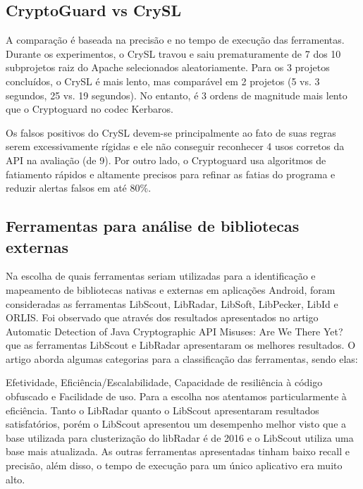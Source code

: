\subsection{CryptoGuard vs CrySL} %

A comparação é baseada na precisão e no tempo de execução das ferramentas. Durante os experimentos, o CrySL travou e saiu prematuramente de 7 dos 10 subprojetos raiz do Apache selecionados aleatoriamente. Para os 3 projetos concluídos, o CrySL é mais lento, mas comparável em 2 projetos (5 vs. 3 segundos, 25 vs. 19 segundos). No entanto, é 3 ordens de magnitude mais lento que o Cryptoguard no codec Kerbaros. 

Os falsos positivos do CrySL devem-se principalmente ao fato de suas regras serem excessivamente rígidas e ele não conseguir reconhecer 4 usos corretos da API na avaliação (de 9). Por outro lado, o Cryptoguard usa algoritmos de fatiamento rápidos e altamente precisos para refinar as fatias do programa e reduzir alertas falsos em até 80\%. 

\subsection{Ferramentas para análise de bibliotecas externas} %

Na escolha de quais ferramentas seriam utilizadas para a identificação e mapeamento de bibliotecas nativas e externas em aplicações Android, foram consideradas as ferramentas LibScout, LibRadar, LibSoft, LibPecker, LibId e ORLIS. Foi observado que através dos resultados apresentados no artigo Automatic Detection of Java Cryptographic API Misuses: Are We There Yet? que as ferramentas LibScout e LibRadar apresentaram os melhores resultados. O artigo aborda algumas categorias para a classificação das ferramentas, sendo elas:

Efetividade, Eficiência/Escalabilidade, Capacidade de resiliência à código obfuscado e Facilidade de uso. Para a escolha nos atentamos particularmente à eficiência. Tanto o LibRadar quanto o LibScout apresentaram resultados satisfatórios, porém o LibScout apresentou um desempenho melhor visto que a base utilizada para clusterização do libRadar é de 2016 e o LibScout utiliza uma base mais atualizada. As outras ferramentas apresentadas tinham baixo recall e precisão, além disso, o tempo de execução para um único aplicativo era muito alto.


